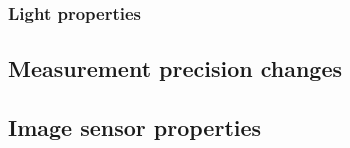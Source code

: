 \subsubsection{Light properties}
\subsection{Measurement precision changes}
\subsection{Image sensor properties}

